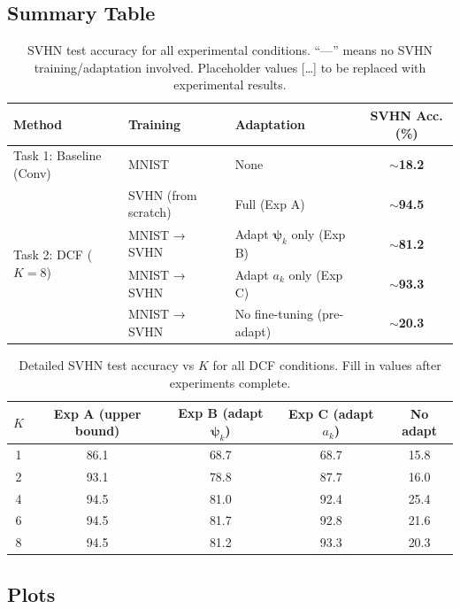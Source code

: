 \documentclass[11pt,letterpaper]{article}
\newcommand{\psivec}{\boldsymbol{\psi}}
\begin{document}
\subsection{Summary Table}

\begin{table}[h]
\centering
\caption{SVHN test accuracy for all experimental conditions.
         ``—'' means no SVHN training/adaptation involved.
         Placeholder values [\ldots] to be replaced with experimental results.}
\label{tab:main_results}
\begin{tabular}{lllc}
\toprule
\textbf{Method} & \textbf{Training} & \textbf{Adaptation} & \textbf{SVHN Acc. (\%)} \\
\midrule
Task 1: Baseline (Conv) & MNIST & None & $\sim$\textbf{18.2} \\
\midrule
\multirow{4}{*}{Task 2: DCF ($K=8$)}
& SVHN (from scratch)  & Full (Exp A)                       & $\sim$\textbf{94.5} \\
& MNIST → SVHN         & Adapt $\psivec_k$ only (Exp B)     & $\sim$\textbf{81.2} \\
& MNIST → SVHN         & Adapt $a_k$ only (Exp C)           & $\sim$\textbf{93.3} \\
& MNIST → SVHN         & No fine-tuning (pre-adapt)         & $\sim$\textbf{20.3} \\
\bottomrule
\end{tabular}
\end{table}

\begin{table}[h]
\centering
\caption{Detailed SVHN test accuracy vs $K$ for all DCF conditions.
         Fill in values after experiments complete.}
\label{tab:vs_K}
\begin{tabular}{c cccc}
\toprule
$K$ & Exp A (upper bound) & Exp B (adapt $\psivec_k$) & Exp C (adapt $a_k$) & No adapt \\
\midrule
1  & 86.1 & 68.7 & 68.7 & 15.8 \\
2  & 93.1 & 78.8 & 87.7 & 16.0 \\
4  & 94.5 & 81.0 & 92.4 & 25.4 \\
6  & 94.5 & 81.7 & 92.8 & 21.6 \\
8  & 94.5 & 81.2 & 93.3 & 20.3 \\
\bottomrule
\end{tabular}
\end{table}

\subsection{Plots}
\end{document}
